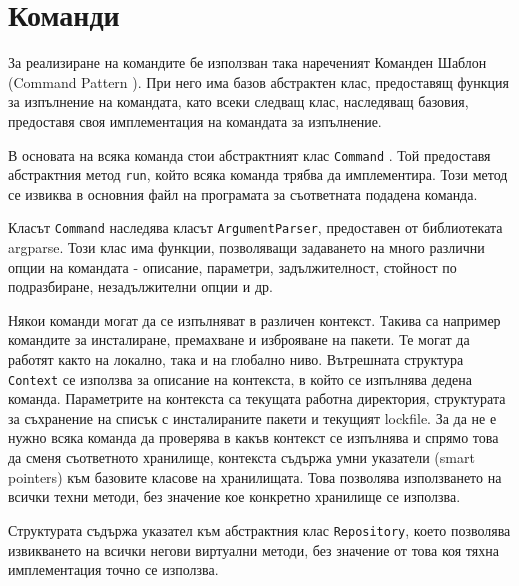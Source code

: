 \section{Команди}

За реализиране на командите бе използван така нареченият Команден Шаблон
(Command Pattern \cite{gof}). При него има базов абстрактен клас, предоставящ
функция за изпълнение на командата, като всеки следващ клас, наследяващ базовия,
предоставя своя имплементация на командата за изпълнение.

В основата на всяка команда стои абстрактният клас \texttt{Command}
. Той предоставя абстрактния метод \texttt{run}, който всяка
команда трябва да имплементира. Този метод се извиква в основния файл на
програмата за съответната подадена команда.

Класът \texttt{Command} наследява класът \texttt{ArgumentParser}, предоставен от
библиотеката argparse. Този клас има функции, позволяващи задаването на много
различни опции на командата - описание, параметри, задължителност, стойност по
подразбиране, незадължителни опции и др.

Някои команди могат да се изпълняват в различен контекст. Такива са например
командите за инсталиране, премахване и изброяване на пакети. Те могат да работят
както на локално, така и на глобално ниво. Вътрешната структура \texttt{Context}
се използва за описание на контекста, в който се изпълнява дедена команда.
Параметрите на контекста са текущата работна директория, структурата за
съхранение на списък с инсталираните пакети и текущият lockfile. За да не е
нужно всяка команда да проверява в какъв контекст се изпълнява и спрямо това да
сменя съответното хранилище, контекста съдържа умни указатели (smart pointers)
към базовите класове на хранилищата. Това позволява използването на всички
техни методи, без значение кое конкретно хранилище се използва.

Структурата съдържа указател към абстрактния клас \texttt{Repository}, което
позволява извикването на всички негови виртуални методи, без значение от това
коя тяхна имплементация точно се използва.

